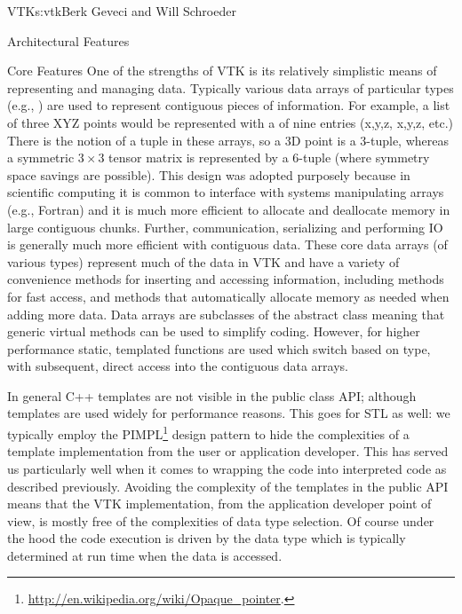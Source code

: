 \begin{aosachapter}{VTK}{s:vtk}{Berk Geveci and Will Schroeder}
\begin{aosasect1}{Architectural Features}
\begin{aosasect2}{Core Features}
One of the strengths of VTK is its relatively simplistic means of
representing and managing data. Typically various data arrays of
particular types (e.g., ) are used to represent
contiguous pieces of information. For example, a list of three XYZ
points would be represented with a  of nine
entries (x,y,z, x,y,z, etc.) There is the notion of a tuple in these
arrays, so a 3D point is a 3-tuple, whereas a symmetric $3{\times}3$
tensor matrix is represented by a 6-tuple (where symmetry space
savings are possible). This design was adopted purposely because in
scientific computing it is common to interface with systems
manipulating arrays (e.g., Fortran) and it is much more efficient to
allocate and deallocate memory in large contiguous chunks. Further,
communication, serializing and performing IO is generally much more
efficient with contiguous data. These core data arrays (of various
types) represent much of the data in VTK and have a variety of
convenience methods for inserting and accessing information, including
methods for fast access, and methods that automatically allocate
memory as needed when adding more data. Data arrays are subclasses of
the  abstract class meaning that generic virtual
methods can be used to simplify coding. However, for higher
performance static, templated functions are used which switch based on
type, with subsequent, direct access into the contiguous data arrays.

In general C++ templates are not visible in the public class API;
although templates are used widely for performance reasons. This goes
for STL as well: we typically employ the
PIMPL\footnote{\url{http://en.wikipedia.org/wiki/Opaque\_pointer}.}
design pattern to hide the complexities of a template implementation
from the user or application developer. This has served us
particularly well when it comes to wrapping the code into interpreted
code as described previously. Avoiding the complexity of the templates
in the public API means that the VTK implementation, from the
application developer point of view, is mostly free of the
complexities of data type selection. Of course under the hood the code
execution is driven by the data type which is typically determined at
run time when the data is accessed.


\end{aosasect2}
\end{aosasect1}
\end{aosachapter}
